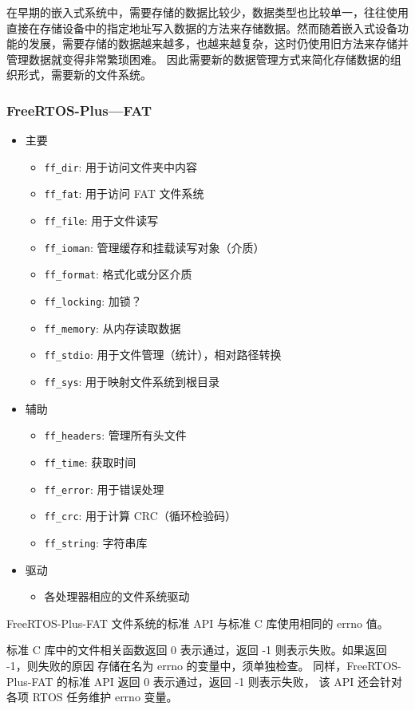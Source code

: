 \documentclass[a4paper]{article}
\begin{document}
在早期的嵌入式系统中，需要存储的数据比较少，数据类型也比较单一，往往使用直接在存储设备中的指定地址写入数据的方法来存储数据。然而随着嵌入式设备功能的发展，需要存储的数据越来越多，也越来越复杂，这时仍使用旧方法来存储并管理数据就变得非常繁琐困难。
因此需要新的数据管理方式来简化存储数据的组织形式，需要新的文件系统。
\subsubsection{FreeRTOS-Plus—FAT}
\begin{itemize}
\item 主要
\begin{itemize}
    \item \texttt{ff\_dir}: 用于访问文件夹中内容
    \item \texttt{ff\_fat}: 用于访问 FAT 文件系统
    \item \texttt{ff\_file}: 用于文件读写
    \item \texttt{ff\_ioman}: 管理缓存和挂载读写对象（介质）
    \item \texttt{ff\_format}: 格式化或分区介质
    \item \texttt{ff\_locking}: 加锁？
    \item \texttt{ff\_memory}: 从内存读取数据
    \item \texttt{ff\_stdio}: 用于文件管理（统计），相对路径转换
    \item \texttt{ff\_sys}: 用于映射文件系统到根目录
\end{itemize}
\item 辅助
\begin{itemize}
    \item \texttt{ff\_headers}: 管理所有头文件
    \item \texttt{ff\_time}: 获取时间
    \item \texttt{ff\_error}:  用于错误处理
    \item \texttt{ff\_crc}: 用于计算 CRC（循环检验码）
    \item \texttt{ff\_string}: 字符串库
\end{itemize}
\item 驱动
\begin{itemize}
    \item 各处理器相应的文件系统驱动
\end{itemize}
\end{itemize}

FreeRTOS-Plus-FAT 文件系统的标准 API 与标准 C 库使用相同的 errno 值。

标准 C 库中的文件相关函数返回 0 表示通过，返回 -1 则表示失败。如果返回 -1，则失败的原因 存储在名为 errno 的变量中，须单独检查。 同样，FreeRTOS-Plus-FAT 的标准 API 返回 0 表示通过，返回 -1 则表示失败， 该 API 还会针对各项 RTOS 任务维护 errno 变量。
\end{document}
